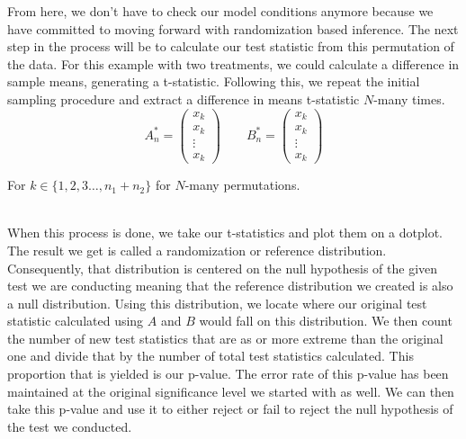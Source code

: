 From here, we don’t have to check our model conditions anymore because we have committed to moving forward with randomization based inference. The next step in the process will be to calculate our test statistic from this permutation of the data. For this example with two treatments, we could calculate a difference in sample means, generating a t-statistic. Following this, we repeat the initial sampling procedure and extract a difference in means t-statistic $N$-many times. 
\\
$$
    A_n^*=\begin{pmatrix}
        x_{k}\\
        x_{k}\\
        \vdots\\
        x_{k}
    \end{pmatrix}\quad\quad
    B_n^*=\begin{pmatrix}
        x_{k}\\
        x_{k}\\
        \vdots\\
        x_{k}
    \end{pmatrix} 
$$
\begin{center}
    For $k\in \{1,2,3\dots,n_1+n_2\}$ for $N$-many permutations.
\end{center}
\newline\\
When this process is done, we take our t-statistics and plot them on a dotplot. The result we get is called a randomization or reference distribution. Consequently, that distribution is centered on the null hypothesis of the given test we are conducting meaning that the reference distribution we created is also a null distribution. Using this distribution, we locate where our original test statistic calculated using $A$ and $B$ would fall on this distribution. We then count the number of new test statistics that are as or more extreme than the original one and divide that by the number of total test statistics calculated. This proportion that is yielded is our p-value. The error rate of this p-value has been maintained at the original significance level we started with as well. We can then take this p-value and use it to either reject or fail to reject the null hypothesis of the test we conducted. 
	
